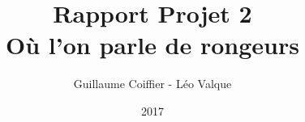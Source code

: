 \documentclass{article}
\title{ \Huge{Rapport Projet 2} \\ Où l'on parle de rongeurs}
\author{Guillaume Coiffier - Léo Valque}
\date{2017}
\begin{document}
\renewcommand{\labelitemi}{$\bullet$}

\maketitle
\tableofcontents
\newpage


\newpage


\nocite{*}


\end{document}

